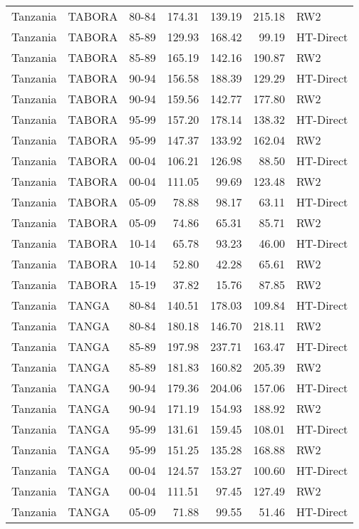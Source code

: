 \begin{longtable}{lllrrrl}
  Tanzania & TABORA & 80-84 & 174.31 & 139.19 & 215.18 & RW2 \\ 
  Tanzania & TABORA & 85-89 & 129.93 & 168.42 & 99.19 & HT-Direct \\ 
  Tanzania & TABORA & 85-89 & 165.19 & 142.16 & 190.87 & RW2 \\ 
  Tanzania & TABORA & 90-94 & 156.58 & 188.39 & 129.29 & HT-Direct \\ 
  Tanzania & TABORA & 90-94 & 159.56 & 142.77 & 177.80 & RW2 \\ 
  Tanzania & TABORA & 95-99 & 157.20 & 178.14 & 138.32 & HT-Direct \\ 
  Tanzania & TABORA & 95-99 & 147.37 & 133.92 & 162.04 & RW2 \\ 
  Tanzania & TABORA & 00-04 & 106.21 & 126.98 & 88.50 & HT-Direct \\ 
  Tanzania & TABORA & 00-04 & 111.05 & 99.69 & 123.48 & RW2 \\ 
  Tanzania & TABORA & 05-09 & 78.88 & 98.17 & 63.11 & HT-Direct \\ 
  Tanzania & TABORA & 05-09 & 74.86 & 65.31 & 85.71 & RW2 \\ 
  Tanzania & TABORA & 10-14 & 65.78 & 93.23 & 46.00 & HT-Direct \\ 
  Tanzania & TABORA & 10-14 & 52.80 & 42.28 & 65.61 & RW2 \\ 
  Tanzania & TABORA & 15-19 & 37.82 & 15.76 & 87.85 & RW2 \\ 
  Tanzania & TANGA & 80-84 & 140.51 & 178.03 & 109.84 & HT-Direct \\ 
  Tanzania & TANGA & 80-84 & 180.18 & 146.70 & 218.11 & RW2 \\ 
  Tanzania & TANGA & 85-89 & 197.98 & 237.71 & 163.47 & HT-Direct \\ 
  Tanzania & TANGA & 85-89 & 181.83 & 160.82 & 205.39 & RW2 \\ 
  Tanzania & TANGA & 90-94 & 179.36 & 204.06 & 157.06 & HT-Direct \\ 
  Tanzania & TANGA & 90-94 & 171.19 & 154.93 & 188.92 & RW2 \\ 
  Tanzania & TANGA & 95-99 & 131.61 & 159.45 & 108.01 & HT-Direct \\ 
  Tanzania & TANGA & 95-99 & 151.25 & 135.28 & 168.88 & RW2 \\ 
  Tanzania & TANGA & 00-04 & 124.57 & 153.27 & 100.60 & HT-Direct \\ 
  Tanzania & TANGA & 00-04 & 111.51 & 97.45 & 127.49 & RW2 \\ 
  Tanzania & TANGA & 05-09 & 71.88 & 99.55 & 51.46 & HT-Direct \\ 

\end{longtable}
